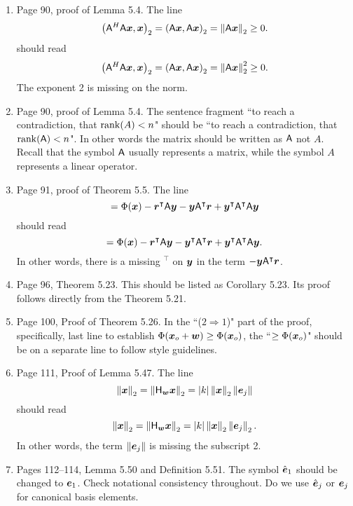 \documentclass{book}
\begin{document}
	\begin{enumerate}
	\item 
Page 90, proof of Lemma 5.4. The line 
	\[
\left(\mathsf{A}^H\mathsf{A}\boldsymbol{x},\boldsymbol{x}\right)_2 = \left(\mathsf{A}\boldsymbol{x},\mathsf{A}\boldsymbol{x}\right)_2 = \left\| \mathsf{A}\boldsymbol{x} \right\|_2 \ge 0 .
	\]
should read
	\[
\left(\mathsf{A}^H\mathsf{A}\boldsymbol{x},\boldsymbol{x}\right)_2 = \left(\mathsf{A}\boldsymbol{x},\mathsf{A}\boldsymbol{x}\right)_2 = \left\| \mathsf{A}\boldsymbol{x} \right\|_2^2\ge 0 .
	\]
The exponent 2 is missing on the norm.
	\item 
Page 90, proof of Lemma 5.4. The sentence fragment ``to reach a contradiction, that $\operatorname{rank}(A) < n$" should be ``to reach a contradiction, that $\operatorname{rank}(\mathsf{A}) < n$". In other words the matrix should be written as $\mathsf{A}$ not $A$. Recall that the symbol $\mathsf{A}$ usually represents a matrix, while the symbol $A$ represents a linear operator.



	\item
Page 91, proof of Theorem 5.5. The line 
	\[
= \Phi(\boldsymbol{x}) - \boldsymbol{r}^\intercal\mathsf{A}\boldsymbol{y} - \boldsymbol{y}\mathsf{A}^\intercal\boldsymbol{r} + \boldsymbol{y}^\intercal\mathsf{A}^\intercal\mathsf{A}\boldsymbol{y}
	\]
should read
	\[
= \Phi(\boldsymbol{x}) - \boldsymbol{r}^\intercal\mathsf{A}\boldsymbol{y} - \boldsymbol{y}^\intercal\mathsf{A}^\intercal\boldsymbol{r} + \boldsymbol{y}^\intercal\mathsf{A}^\intercal\mathsf{A}\boldsymbol{y}.
	\]
In other words, there is a missing ${}^\intercal$ on $\boldsymbol{y}$ in the term $- \boldsymbol{y}\mathsf{A}^\intercal\boldsymbol{r}$.



	\item
Page 96, Theorem 5.23. This should be listed as Corollary 5.23. Its proof follows directly from the Theorem 5.21.

	\item
Page 100, Proof of Theorem 5.26. In the ``($2 \Longrightarrow 1$)" part of the  proof, specifically, last line to establish $\Phi(\boldsymbol{x}_o +\boldsymbol{w}) \ge \Phi(\boldsymbol{x}_o)$, the  ``$\ge \Phi(\boldsymbol{x}_o)$" should be on a separate line to follow style guidelines.

	\item
Page 111, Proof of Lemma 5.47. The line
	\[
\left\| \boldsymbol{x} \right\|_2 = \left\| \mathsf{H}_{\boldsymbol{w}}\boldsymbol{x} \right\|_2 = |k|\left\| \boldsymbol{x} \right\|_2\left\| \boldsymbol{e}_j \right\|	
	\]
should read
	\[
\left\| \boldsymbol{x} \right\|_2 = \left\| \mathsf{H}_{\boldsymbol{w}}\boldsymbol{x} \right\|_2 = |k|\left\| \boldsymbol{x} \right\|_2\left\| \boldsymbol{e}_j \right\|_2.	
	\]
In other words, the term $\left\| \boldsymbol{e}_j \right\|$ is missing the subscript 2.

	\item
Pages 112--114, Lemma 5.50 and Definition 5.51. The symbol $\hat{\boldsymbol{e}}_1$ should be changed to $\boldsymbol{e}_1$. Check notational consistency throughout. Do we use $\hat{\boldsymbol{e}}_j$ or $\boldsymbol{e}_j$ for canonical basis elements.


	\end{enumerate}
	
\end{document}
